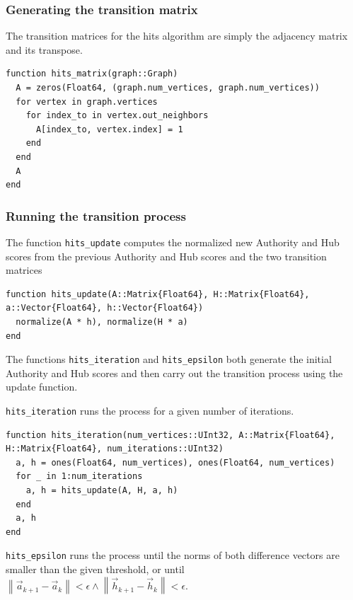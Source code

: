 \documentclass[12pt, titlepage, twoside]{amsart}
\begin{document}
\subsubsection{Generating the transition matrix}

The transition matrices for the hits algorithm are simply the adjacency matrix and its transpose.

\begin{verbatim}
function hits_matrix(graph::Graph)
  A = zeros(Float64, (graph.num_vertices, graph.num_vertices))
  for vertex in graph.vertices
    for index_to in vertex.out_neighbors
      A[index_to, vertex.index] = 1
    end
  end
  A
end
\end{verbatim}

\subsubsection{Running the transition process}

The function \texttt{hits_update} computes the normalized new Authority and Hub scores from the
previous Authority and Hub scores and the two transition matrices

\begin{verbatim}
function hits_update(A::Matrix{Float64}, H::Matrix{Float64}, a::Vector{Float64}, h::Vector{Float64})
  normalize(A * h), normalize(H * a)
end
\end{verbatim}

The functions \texttt{hits_iteration} and \texttt{hits_epsilon}
both generate the initial Authority and Hub scores and then carry out the transition process using the update function.

\texttt{hits_iteration} runs the process for a given number of iterations.

\begin{verbatim}
function hits_iteration(num_vertices::UInt32, A::Matrix{Float64}, H::Matrix{Float64}, num_iterations::UInt32)
  a, h = ones(Float64, num_vertices), ones(Float64, num_vertices)
  for _ in 1:num_iterations
    a, h = hits_update(A, H, a, h)
  end
  a, h
end
\end{verbatim}

\texttt{hits_epsilon} runs the process until the norms of both difference vectors are smaller than 
the given threshold, or until
$\left\lVert
  \vec{a}_{k + 1} - \vec{a}_k
\right\rVert < \epsilon
\wedge
\left\lVert
  \vec{h}_{k + 1} - \vec{h}_k
\right\rVert < \epsilon$.
\end{document}
